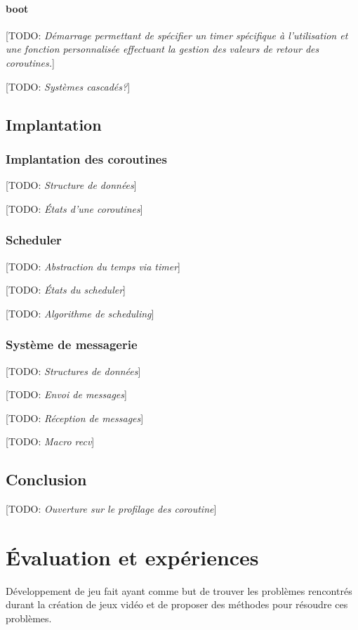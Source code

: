 \documentclass[12pt,oneside,letterpaper,francais]{book}
\newcommand{\todo}[1]{[TODO: {\it #1}]}
\begin{document}
\subsubsection{boot}
\todo{Démarrage permettant de spécifier un timer spécifique à
  l'utilisation et une fonction personnalisée effectuant la gestion
  des valeurs de retour des coroutines.}

\todo{Systèmes cascadés?}


\section{Implantation}

\subsection{Implantation des coroutines}

\todo{Structure de données}

\todo{États d'une coroutines}

\subsection{Scheduler}
\todo{Abstraction du temps via timer}

\todo{États du scheduler}

\todo{Algorithme de scheduling}

\subsection{Système de messagerie}
\todo{Structures de données}

\todo{Envoi de messages}

\todo{Réception de messages}

\todo{Macro recv}


\section{Conclusion}
\todo{Ouverture sur le profilage des coroutine}


\chapter{Évaluation et expériences}

Développement de jeu fait ayant comme but de trouver les problèmes
rencontrés durant la création de jeux vidéo et de proposer des
méthodes pour résoudre ces problèmes.
\end{document}
